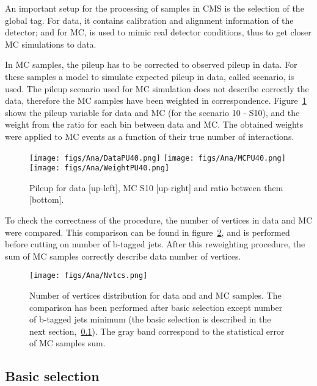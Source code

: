 An important setup for the processing of samples in CMS is the selection of the global tag. For data, it contains calibration and alignment information of the detector; and for MC, is used to mimic real detector conditions, thus to get closer MC simulations to data.

In MC samples, the pileup has to be corrected to observed pileup in data. For these samples a model to simulate expected pileup in data, called scenario, is used. The pileup scenario used for MC simulation does not describe correctly the data, therefore the MC samples have been weighted in correspondence. Figure~\ref{fig:PU_distros} shows the pileup variable for data and MC (for the scenario 10 - S10), and the weight from the ratio for each bin between data and MC. The obtained weights were applied to MC events as a function of their true number of interactions.

\begin{figure}[!Hhtbp]
  \begin{center}
    \texttt{[image: figs/Ana/DataPU40.png]}
    \texttt{[image: figs/Ana/MCPU40.png]}
    \texttt{[image: figs/Ana/WeightPU40.png]}
    \caption{Pileup for data [up-left], MC S10 [up-right] and ratio between them [bottom].}
    \label{fig:PU_distros}
  \end{center}
\end{figure}

To check the correctness of the procedure, the number of vertices in data and MC were compared. This comparison can be found in figure~\ref{fig:NV_dataMC}, and is performed before cutting on number of b-tagged jets. After this reweighting procedure, the sum of MC samples correctly describe data number of vertices.

\begin{figure}[!Hhtbp]
  \begin{center}
    \texttt{[image: figs/Ana/Nvtcs.png]}
    \caption{Number of vertices distribution for data and and MC samples. The comparison has been performed after basic selection except number of b-tagged jets minimum (the basic selection is described in the next section,~\ref{sec:basicsel}). The gray band correspond to the statistical error of MC samples sum.}
    \label{fig:NV_dataMC}
  \end{center}
\end{figure}

\subsection{Basic selection}
\label{sec:basicsel}

